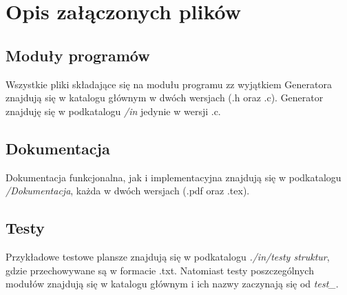 \documentclass{article}
\begin{document}
\section{Opis załączonych plików}
\subsection{Moduły programów}
Wszystkie pliki składające się na modułu programu zz wyjątkiem Generatora
znajdują się w katalogu głównym w dwóch wersjach (.h oraz .c). Generator
znajduję się w podkatalogu \textit{/in} jedynie w wersji .c.

\subsection{Dokumentacja}
Dokumentacja funkcjonalna, jak i implementacyjna znajdują się w podkatalogu
\textit{/Dokumentacja}, każda w dwóch wersjach (.pdf oraz .tex).

\subsection{Testy}
Przykładowe testowe plansze znajdują się w podkatalogu \textit{./in/testy struktur},
gdzie przechowywane są w formacie .txt. Natomiast testy poszczególnych
modułów znajdują się w katalogu głównym i ich nazwy zaczynają się od
\textit{test\_}.
\end{document}

